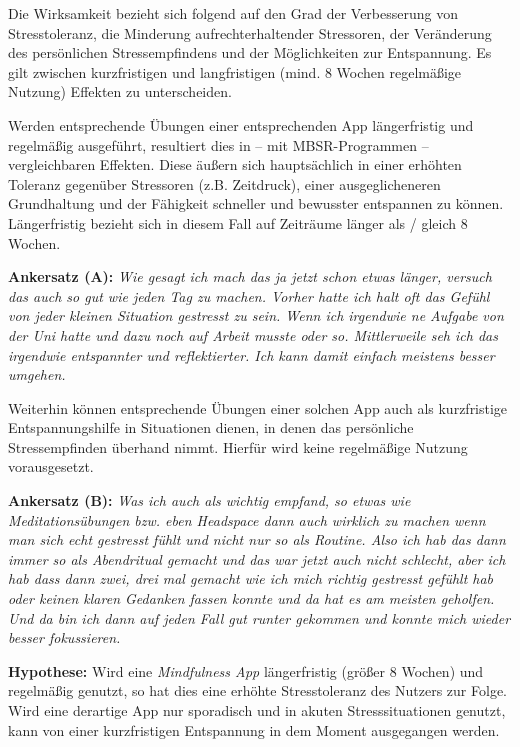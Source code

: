 \documentclass[10pt]{article}
\begin{document}
Die Wirksamkeit bezieht sich folgend auf den Grad der Verbesserung von Stresstoleranz, die Minderung aufrechterhaltender Stressoren, der Veränderung des persönlichen Stressempfindens und der Möglichkeiten zur Entspannung. Es gilt zwischen kurzfristigen und langfristigen (mind. 8 Wochen regelmäßige Nutzung) Effekten zu unterscheiden.

Werden entsprechende Übungen einer entsprechenden App längerfristig und regelmäßig ausgeführt, resultiert dies in – mit MBSR-Programmen –vergleichbaren Effekten. Diese äußern sich hauptsächlich in einer erhöhten Toleranz gegenüber Stressoren (z.B. Zeitdruck), einer ausgeglicheneren Grundhaltung und der Fähigkeit schneller und bewusster  entspannen zu können. Längerfristig bezieht sich in diesem Fall auf Zeiträume länger als / gleich 8 Wochen.

\medskip

\textbf{Ankersatz (A):}
\newline
\grqq\textit{Wie gesagt ich mach das ja jetzt schon etwas länger, versuch das auch so gut wie jeden Tag zu machen. Vorher hatte ich halt oft das Gefühl von jeder kleinen Situation gestresst zu sein. Wenn ich irgendwie ne Aufgabe von der Uni hatte und dazu noch auf Arbeit musste oder so. Mittlerweile seh ich das irgendwie entspannter und reflektierter. Ich kann damit einfach meistens besser umgehen.}\grqq\

\medskip

Weiterhin können entsprechende Übungen einer solchen App auch als kurzfristige Entspannungshilfe in Situationen dienen, in denen das persönliche Stressempfinden überhand nimmt. Hierfür wird keine regelmäßige Nutzung vorausgesetzt.

\medskip

\textbf{Ankersatz (B):}
\newline
\grqq\textit{Was ich auch als wichtig empfand, so etwas wie Meditationsübungen bzw. eben Headspace dann auch wirklich zu machen wenn man sich echt gestresst fühlt und nicht nur so als Routine. Also ich hab das dann immer so als Abendritual gemacht und das war jetzt auch nicht schlecht, aber ich hab dass dann zwei, drei mal gemacht wie ich mich richtig gestresst gefühlt hab oder keinen klaren Gedanken fassen konnte und da hat es am meisten geholfen. Und da bin ich dann auf jeden Fall gut runter gekommen und konnte mich wieder besser fokussieren. }\grqq\

\medskip

\textbf{Hypothese: }
\newline
Wird eine \textit{Mindfulness App} längerfristig (größer 8 Wochen)  und regelmäßig genutzt, so hat dies eine erhöhte Stresstoleranz des Nutzers zur Folge. Wird eine derartige App nur sporadisch und in akuten Stresssituationen genutzt, kann von einer kurzfristigen Entspannung in dem Moment ausgegangen werden.
\end{document}
